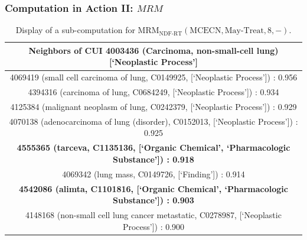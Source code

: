 \documentclass{beamer}
\newcommand\T{\rule{0pt}{2.6ex}}       %
\newcommand\B{\rule[-1.2ex]{0pt}{0pt}} %
\begin{document}
\begin{frame}
\frametitle{Computation in Action II: $MRM$}

\begin{table}[t]
\caption{\centering
\scriptsize Display of a sub-computation for $\text{MRM}_{\text{NDF-RT}}(\text{MCECN},\text{May-Treat},8,-)$. 
}{
\tiny
\begin{center}
\begin{tabular}{|c|} 
\hline
Neighbors of CUI 4003436 (Carcinoma, non-small-cell lung) [`Neoplastic Process'] 
\T \B \\ 
\hline
4069419 (small cell carcinoma of lung, C0149925,  [`Neoplastic Process']) : 0.956 \T \B \\
4394316 (carcinoma of lung, C0684249,  [`Neoplastic Process']) : 0.934 
\T \B \\
4125384 (malignant neoplasm of lung, C0242379,  [`Neoplastic Process']) : 0.929 \T \B \\
4070138 (adenocarcinoma of lung (disorder), C0152013,  [`Neoplastic Process']) : 0.925\T \B \\
\textbf{4555365 (tarceva, C1135136,  [`Organic Chemical', `Pharmacologic Substance']) : 0.918} \T \B \\
4069342 (lung mass, C0149726,  [`Finding']) : 0.914 \T \B \\
\textbf{4542086 (alimta, C1101816,  [`Organic Chemical', `Pharmacologic Substance']) : 0.903} \T \B \\
4148168 (non-small cell lung cancer metastatic, C0278987,  [`Neoplastic Process']) : 0.900 \T \B \\
\hline
\end{tabular}
\end{center}
}
\end{table}
\end{frame}
\end{document}
